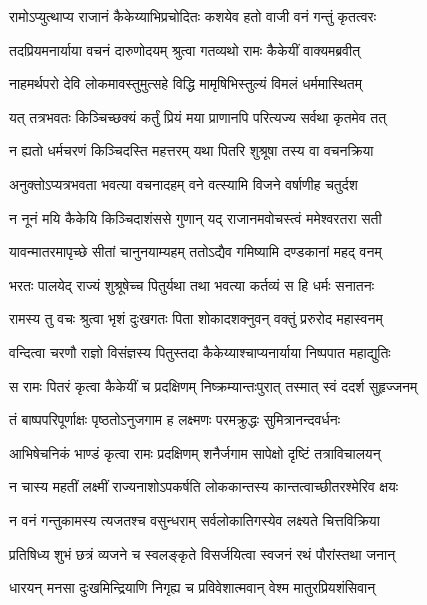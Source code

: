 \twolineshloka
{रामोऽप्युत्थाप्य राजानं कैकेय्याभिप्रचोदितः}
{कशयेव हतो वाजी वनं गन्तुं कृतत्वरः} %

\twolineshloka
{तदप्रियमनार्याया वचनं दारुणोदयम्}
{श्रुत्वा गतव्यथो रामः कैकेयीं वाक्यमब्रवीत्} %

\twolineshloka
{नाहमर्थपरो देवि लोकमावस्तुमुत्सहे}
{विद्धि मामृषिभिस्तुल्यं विमलं धर्ममास्थितम्} %

\twolineshloka
{यत् तत्रभवतः किञ्चिच्छक्यं कर्तुं प्रियं मया}
{प्राणानपि परित्यज्य सर्वथा कृतमेव तत्} %

\twolineshloka
{न ह्यतो धर्मचरणं किञ्चिदस्ति महत्तरम्}
{यथा पितरि शुश्रूषा तस्य वा वचनक्रिया} %

\twolineshloka
{अनुक्तोऽप्यत्रभवता भवत्या वचनादहम्}
{वने वत्स्यामि विजने वर्षाणीह चतुर्दश} %

\twolineshloka
{न नूनं मयि कैकेयि किञ्चिदाशंससे गुणान्}
{यद् राजानमवोचस्त्वं ममेश्वरतरा सती} %

\twolineshloka
{यावन्मातरमापृच्छे सीतां चानुनयाम्यहम्}
{ततोऽद्यैव गमिष्यामि दण्डकानां महद् वनम्} %

\twolineshloka
{भरतः पालयेद् राज्यं शुश्रूषेच्च पितुर्यथा}
{तथा भवत्या कर्तव्यं स हि धर्मः सनातनः} %

\twolineshloka
{रामस्य तु वचः श्रुत्वा भृशं दुःखगतः पिता}
{शोकादशक्नुवन् वक्तुं प्ररुरोद महास्वनम्} %

\twolineshloka
{वन्दित्वा चरणौ राज्ञो विसंज्ञस्य पितुस्तदा}
{कैकेय्याश्चाप्यनार्याया निष्पपात महाद्युतिः} %

\twolineshloka
{स रामः पितरं कृत्वा कैकेयीं च प्रदक्षिणम्}
{निष्क्रम्यान्तःपुरात् तस्मात् स्वं ददर्श सुहृज्जनम्} %

\twolineshloka
{तं बाष्पपरिपूर्णाक्षः पृष्ठतोऽनुजगाम ह}
{लक्ष्मणः परमक्रुद्धः सुमित्रानन्दवर्धनः} %

\twolineshloka
{आभिषेचनिकं भाण्डं कृत्वा रामः प्रदक्षिणम्}
{शनैर्जगाम सापेक्षो दृष्टिं तत्राविचालयन्} %

\twolineshloka
{न चास्य महतीं लक्ष्मीं राज्यनाशोऽपकर्षति}
{लोककान्तस्य कान्तत्वाच्छीतरश्मेरिव क्षयः} %

\twolineshloka
{न वनं गन्तुकामस्य त्यजतश्च वसुन्धराम्}
{सर्वलोकातिगस्येव लक्ष्यते चित्तविक्रिया} %

\twolineshloka
{प्रतिषिध्य शुभं छत्रं व्यजने च स्वलङ्कृते}
{विसर्जयित्वा स्वजनं रथं पौरांस्तथा जनान्} %

\twolineshloka
{धारयन् मनसा दुःखमिन्द्रियाणि निगृह्य च}
{प्रविवेशात्मवान् वेश्म मातुरप्रियशंसिवान्} %

